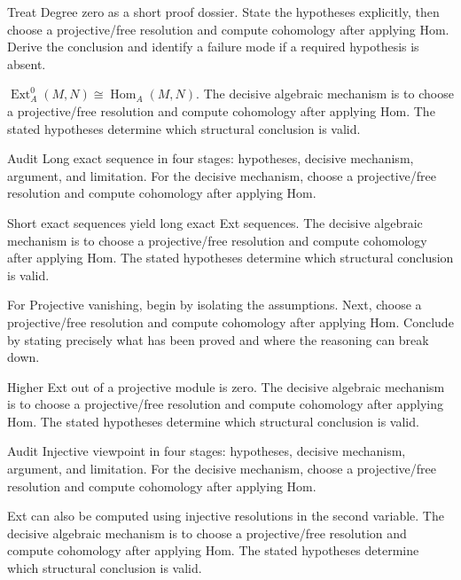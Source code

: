 \begin{problem}\label{prob:v27-problem-02}
Treat Degree zero as a short proof dossier. State the hypotheses explicitly, then choose a projective/free resolution and compute cohomology after applying Hom. Derive the conclusion and identify a failure mode if a required hypothesis is absent.
\end{problem}
\begin{solution}
$\operatorname{Ext}_A^0(M,N)\cong\operatorname{Hom}_A(M,N)$. The decisive algebraic mechanism is to choose a projective/free resolution and compute cohomology after applying Hom. The stated hypotheses determine which structural conclusion is valid.
\end{solution}

\begin{problem}\label{prob:v27-problem-03}
Audit Long exact sequence in four stages: hypotheses, decisive mechanism, argument, and limitation. For the decisive mechanism, choose a projective/free resolution and compute cohomology after applying Hom.
\end{problem}
\begin{solution}
Short exact sequences yield long exact Ext sequences. The decisive algebraic mechanism is to choose a projective/free resolution and compute cohomology after applying Hom. The stated hypotheses determine which structural conclusion is valid.
\end{solution}

\begin{problem}\label{prob:v27-problem-04}
For Projective vanishing, begin by isolating the assumptions. Next, choose a projective/free resolution and compute cohomology after applying Hom. Conclude by stating precisely what has been proved and where the reasoning can break down.
\end{problem}
\begin{solution}
Higher Ext out of a projective module is zero. The decisive algebraic mechanism is to choose a projective/free resolution and compute cohomology after applying Hom. The stated hypotheses determine which structural conclusion is valid.
\end{solution}

\begin{problem}\label{prob:v27-problem-05}
Audit Injective viewpoint in four stages: hypotheses, decisive mechanism, argument, and limitation. For the decisive mechanism, choose a projective/free resolution and compute cohomology after applying Hom.
\end{problem}
\begin{solution}
Ext can also be computed using injective resolutions in the second variable. The decisive algebraic mechanism is to choose a projective/free resolution and compute cohomology after applying Hom. The stated hypotheses determine which structural conclusion is valid.
\end{solution}

